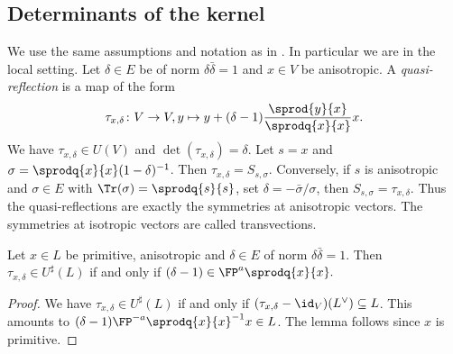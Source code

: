 %
%
%


\subsection{Determinants of the kernel}
We use the same assumptions and notation as in .
In particular we are in the local setting.
Let $\delta \in E$ be of norm $\delta \bar \delta = 1$ and $x \in V$ be anisotropic.
A \emph{quasi-reflection} is a map of the form
\[\tau_{x,\delta}\colon V \rightarrow V, y \mapsto y + (\delta-1)\frac{\sprod{y}{x}}{\sprodq{x}{x}} x.\]
We have $\tau_{x,\delta} \in U(V)$ and $\det(\tau_{x,\delta}) = \delta$.
Let $s = x$ and $\sigma = \sprodq{x}{x}(1-\delta)^{-1}$.
Then $\tau_{x,\delta}=S_{s,\sigma}$.
Conversely, if $s$ is anisotropic and $\sigma \in E$ with $\Tr(\sigma)=\sprodq{s}{s}$, set $\delta = - \bar \sigma / \sigma$, then
$S_{s,\sigma} = \tau_{x,\delta}$. Thus the quasi-reflections are exactly the symmetries at anisotropic vectors. The symmetries at isotropic vectors are called transvections.

\begin{lemma}\label{ker:refl}
Let $x \in L$ be primitive, anisotropic and $\delta \in E$ of norm $\delta \bar \delta = 1$. Then
$\tau_{x,\delta} \in U^\sharp(L)$ if and only if
$(\delta - 1) \in \FP^{a} \sprodq{x}{x}.$
\end{lemma}
\begin{proof}
 We have $\tau_{x,\delta} \in U^\sharp(L)$ if and only if
 $(\tau_{x,\delta}-\id_V)(L^\vee)\subseteq L$. This amounts to $(\delta-1)\FP^{-a}\sprodq{x}{x}^{-1}x \in L$.
 The lemma follows since $x$ is primitive.
\end{proof}

